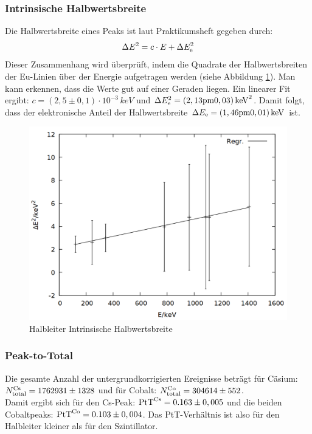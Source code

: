 \subsubsection*{Intrinsische Halbwertsbreite}
Die Halbwertsbreite eines Peaks ist laut Praktikumsheft \cite{praktikumsheft} gegeben durch:
\begin{align*}
\Delta E^2 = c \cdot E + \Delta E\ind{e}^2
\end{align*}
Dieser Zusammenhang wird überprüft, indem die Quadrate der Halbwertsbreiten der Eu-Linien über der Energie aufgetragen werden (siehe Abbildung \ref{fig:ge_intrinsic}). Man kann erkennen, dass die Werte gut auf einer Geraden liegen. Ein linearer Fit ergibt: $c = \si{(2,5 \pm 0,1)\cdot 10^{-3}\,keV}$ und $\Delta E\ind{e}^2 = \si{(2,13 \pm 0,03)\,keV^2}$. Damit folgt, dass der elektronische Anteil der Halbwertsbreite $\Delta E\ind{e} = \si{(1,46 \pm 0,01)\,keV}$ ist.

\begin{figure}
\centering
\includegraphics[width=0.7\linewidth]{data/ge_intrinsic.png}
\caption{Halbleiter Intrinsische Halbwertsbreite}
\label{fig:ge_intrinsic}
\end{figure}


\subsubsection*{Peak-to-Total}
Die gesamte Anzahl der untergrundkorrigierten Ereignisse beträgt für Cäsium: $N\ind{total}\upd{Cs} = 1762931 \pm 1328$ und für Cobalt: $N\ind{total}\upd{Co} = 304614\pm 552$.\\
Damit ergibt sich für den Cs-Peak: $\text{PtT}\upd{Cs} = 0.163\pm 0,005$ und die beiden Cobaltpeaks: $\text{PtT}\upd{Co} = 0.103\pm 0,004$. Das PtT-Verhältnis ist also für den Halbleiter kleiner als für den Szintillator.


